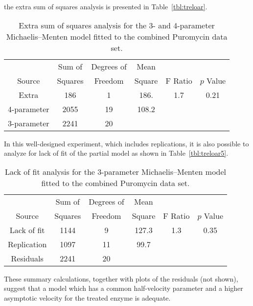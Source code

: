 \begin{example}
\begin{table}
\begin{center}
    \end{center}
  \end{table}
  the extra sum of squares analysis is presented in
  Table~\ref{tbl:treloar}.
  \begin{table}
    \caption{
      Extra sum of squares analysis for the 3- and 4-parameter
      Michaelis--Menten model fitted to the combined Puromycin data set.
    }\label{tbl&treloar}
    \begin{center}
      \begin{tabular}{cccccc}\hline
        & \multicolumn{1}{c}{Sum of} & \multicolumn{1}{c}{Degrees of}
        &\multicolumn{1}{c}{Mean}\\ \multicolumn{1}{c}{Source} &
        \multicolumn{1}{c}{Squares} &\multicolumn{1}{c}{Freedom} &
        \multicolumn{1}{c}{Square} & \multicolumn{1}{c}{F Ratio}
        &\multicolumn{1}{c}{$p$ Value}\\
        \hline Extra&186&1&186.&1.7&0.21\\
        4-parameter&2055&19&108.2\\
        3-parameter&2241&20\\ \hline
      \end{tabular}
    \end{center}
  \end{table}
  
  In this well-designed experiment, which includes replications, it
  is also possible to analyze for lack of fit of the partial model as
  shown in Table~\ref{tbl:treloar5}.
  \begin{table}
    \caption{
      Lack of fit analysis for the 3-parameter Michaelis--Menten model
      fitted to the combined Puromycin data set.  }\label{tbl&treloar5}
    \begin{center}
      \begin{tabular}{cccccc}
        & \multicolumn{1}{c}{Sum of} & \multicolumn{1}{c}{Degrees
          of} & \multicolumn{1}{c}{Mean}\\ \multicolumn{1}{c}{Source} &
        \multicolumn{1}{c}{Squares} & \multicolumn{1}{c}{Freedom} &
        \multicolumn{1}{c}{Square} & \multicolumn{1}{c}{F Ratio} &
        \multicolumn{1}{c}{$p$ Value}\\ \hline
        Lack of fit &1144&9&127.3&1.3&0.35\\
        Replication&1097&11&99.7\\ \hline
        Residuals&2241&20\\ \hline
      \end{tabular}
    \end{center}
  \end{table}
  These summary calculations, together with plots of the residuals
  (not shown), suggest that a model which has a common
  half-velocity parameter and a higher asymptotic velocity for
  the treated enzyme is adequate.
\end{example}

